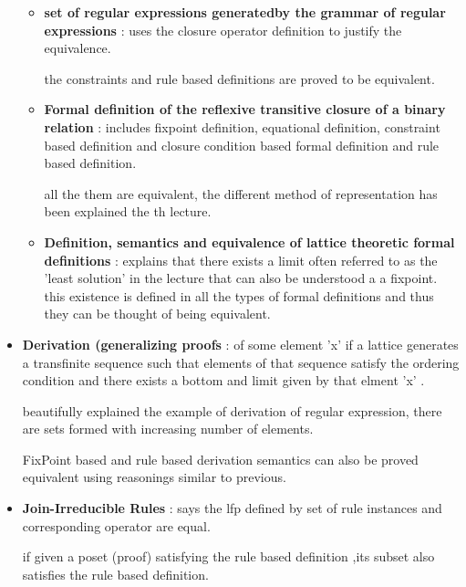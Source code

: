 \begin{itemize}
{\begin{itemize}
{		The proof-theoretic and fixpoint-theoretic definitions on the set S defined by a formal system are equivalent.

		example: rule based constraint definition and closure conditions. 
		}

		\item{\textbf{set of regular expressions generatedby the grammar of regular expressions} :
		uses the closure operator definition to justify the equivalence.

		the constraints and rule based definitions are proved to be equivalent.
		}

		\item{\textbf{Formal definition of the reflexive transitive closure of a binary relation} :
		includes fixpoint definition, equational definition, constraint based definition and closure condition based formal definition and rule based definition.

		all the them are equivalent, the different method of representation has been explained the th lecture.
		}

		\item{\textbf{Definition, semantics and equivalence of lattice theoretic formal definitions} : explains that there exists a limit often referred to as the 'least solution' in the lecture that can also be understood a a fixpoint. this existence is defined in all the types of formal definitions and thus they can be thought of being equivalent.
		}

	\end{itemize}
	}

	\item{\textbf{Derivation (generalizing proofs} : of some element 'x' if a lattice generates a transfinite sequence such that elements of that sequence satisfy the ordering condition and there exists a bottom and limit given by that elment 'x' .

	beautifully explained the example of derivation of regular expression, there are sets formed with increasing number of elements.

	FixPoint based and rule based derivation semantics can also be proved equivalent using reasonings similar to previous.
	}

	\item{\textbf{Join-Irreducible Rules} : says the lfp defined by set of rule instances and corresponding operator are equal.

	if given a poset (proof) satisfying the rule based definition ,its subset also satisfies the rule based definition. 

}
\end{itemize}
